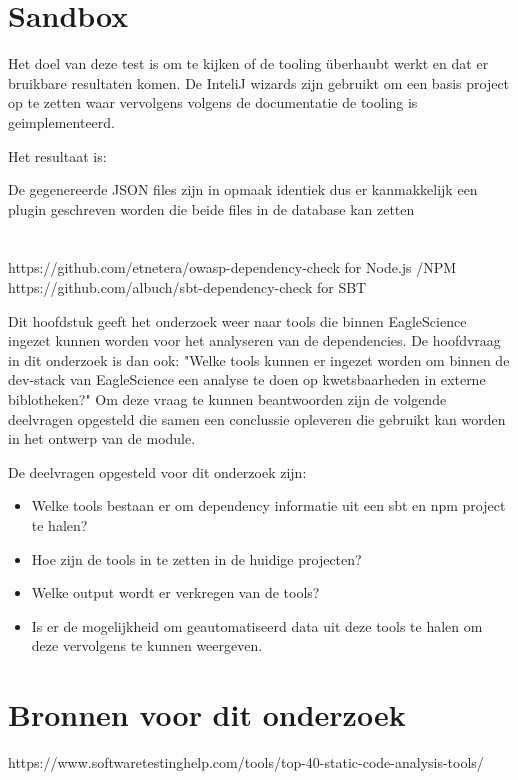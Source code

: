 \section{Sandbox}
Het doel van deze test is om te kijken of de tooling überhaubt werkt en dat er bruikbare resultaten komen. De InteliJ wizards zijn gebruikt om een basis project op te zetten waar vervolgens volgens de documentatie de tooling is geimplementeerd.

Het resultaat is:

De gegenereerde JSON files zijn in opmaak identiek dus er kanmakkelijk een plugin geschreven worden die beide files in de database kan zetten
\section{}

https://github.com/etnetera/owasp-dependency-check for Node.js /NPM
https://github.com/albuch/sbt-dependency-check for SBT


Dit hoofdstuk geeft het onderzoek weer naar tools die binnen EagleScience ingezet kunnen worden voor het analyseren van de dependencies. De hoofdvraag in dit onderzoek is dan ook: "Welke tools kunnen er ingezet worden om binnen de dev-stack van EagleScience een analyse te doen op kwetsbaarheden in externe biblotheken?" Om deze vraag te kunnen beantwoorden zijn de volgende deelvragen opgesteld die samen een conclussie opleveren die gebruikt kan worden in het ontwerp van de module.

De deelvragen opgesteld voor dit onderzoek zijn:\\
\begin{itemize}
    \item Welke tools bestaan er om dependency informatie uit een sbt en npm project te halen?
    \item Hoe zijn de tools in te zetten in de huidige projecten?
    \item Welke output wordt er verkregen van de tools?
    \item Is er de mogelijkheid om geautomatiseerd data uit deze tools te halen om deze vervolgens te kunnen weergeven.
\end{itemize}

\section{Bronnen voor dit onderzoek}
https://www.softwaretestinghelp.com/tools/top-40-static-code-analysis-tools/
